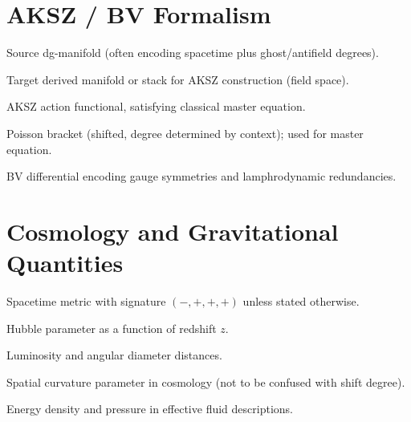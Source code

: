 \documentclass[12pt]{article}
\theoremstyle{plain}
\theoremstyle{definition}
\theoremstyle{remark}
\begin{document}
\section{AKSZ / BV Formalism}

\begin{description}[leftmargin=2.5cm,style=nextline]

\item[$\Sigma$]
Source dg-manifold (often encoding spacetime plus ghost/antifield degrees).

\item[$\mathcal{X}$]
Target derived manifold or stack for AKSZ construction (field space).

\item[$S_{\rm AKSZ}$]
AKSZ action functional, satisfying classical master equation.

\item[$\{\cdot,\cdot\}$]
Poisson bracket (shifted, degree determined by context); used for master equation.

\item[$d_{\rm BV}$]
BV differential encoding gauge symmetries and lamphrodynamic redundancies.

\end{description}


\section{Cosmology and Gravitational Quantities}

\begin{description}[leftmargin=2.5cm,style=nextline]

\item[$g_{ab}$]
Spacetime metric with signature $(-,+,+,+)$ unless stated otherwise.

\item[$H(z)$]
Hubble parameter as a function of redshift $z$.

\item[$d_L$, $d_A$]
Luminosity and angular diameter distances.

\item[$k$]
Spatial curvature parameter in cosmology (not to be confused with shift degree).

\item[$\rho$, $p$]
Energy density and pressure in effective fluid descriptions.

\end{description}
\end{document}
